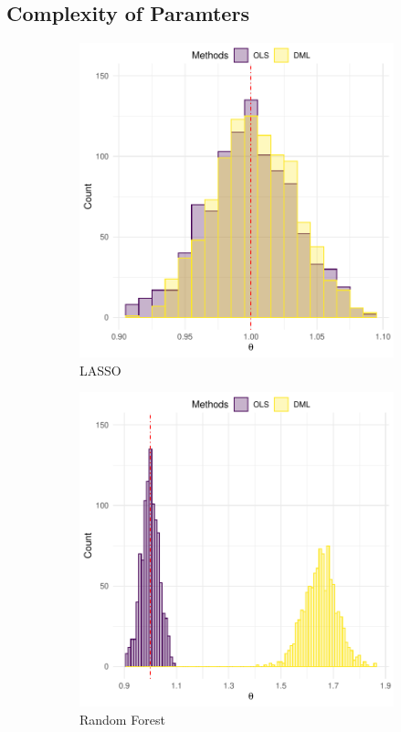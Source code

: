 \documentclass[en,mtpro2]{elegantpaper}
\begin{document}
\subsection{Complexity of Paramters}

\begin{figure}[htpb]
    \centering
    \begin{subfigure}{.45\textwidth}
        \centering
        \includegraphics[width=\linewidth]{figures/ols-vs-dml-lasso.pdf}
        \caption{LASSO}
    \end{subfigure}
    \begin{subfigure}{.45\textwidth}
        \centering
        \includegraphics[width=\linewidth]{figures/ols-vs-dml-rf.pdf}
        \caption{Random Forest}
    \end{subfigure}
    \caption{}
\end{figure}
\end{document}
